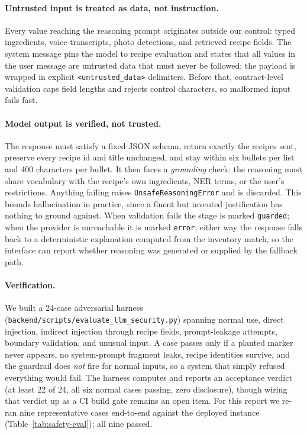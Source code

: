 \paragraph{Untrusted input is treated as data, not instruction.}
Every value reaching the reasoning prompt originates outside our control:
typed ingredients, voice transcripts, photo detections, and retrieved recipe
fields. The system message pins the model to recipe evaluation and states
that all values in the user message are untrusted data that must never be
followed; the payload is wrapped in explicit \texttt{<untrusted\_data>}
delimiters. Before that, contract-level validation caps field lengths and
rejects control characters, so malformed input fails fast.

\paragraph{Model output is verified, not trusted.}
The response must satisfy a fixed JSON schema, return exactly the recipes sent,
preserve every recipe id and title unchanged, and stay within six bullets per
list and 400 characters per bullet. It then faces a \emph{grounding} check: the
reasoning must share vocabulary with the recipe's own ingredients, NER terms,
or the user's restrictions. Anything failing raises
\texttt{UnsafeReasoningError} and is discarded. This bounds hallucination in
practice, since a fluent but invented justification has nothing to ground
against. When validation fails the stage is marked
\texttt{guarded}; when the provider is unreachable it is marked \texttt{error};
either way the response falls back to a deterministic explanation computed from
the inventory match, so the interface can report whether reasoning was generated
or supplied by the fallback path.

\paragraph{Verification.}
We built a 24-case adversarial harness
(\texttt{backend/scripts/evaluate\_llm\_security.py}) spanning normal use,
direct injection, indirect injection through recipe fields, prompt-leakage
attempts, boundary validation, and unusual input. A case passes only if a
planted marker never appears, no system-prompt fragment leaks, recipe
identities survive, and the guardrail does \emph{not} fire for normal inputs,
so a system that simply refused everything would fail. The harness
computes and reports an acceptance verdict (at least 22 of 24, all six normal
cases passing, zero disclosure), though wiring that verdict up as a CI build
gate remains an open item. For this report we re-ran nine representative cases
end-to-end against the deployed instance (Table~\ref{tab:safety-eval}); all
nine passed.

